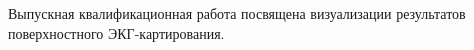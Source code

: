 Выпускная квалификационная работа посвящена визуализации результатов поверхностного ЭКГ-картирования.
